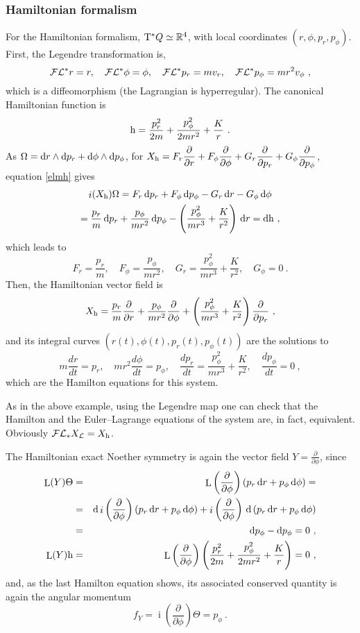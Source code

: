 \documentclass[12pt]{report}
\def\beann{\begin{eqnarray*}}
\def\eeann{\end{eqnarray*}}
\def\dst{\displaystyle}
\def\derpar#1#2{\frac{\partial{#1}}{\partial{#2}}}
\def\Lag{{\cal L}}
\def\d{{\rm d}}
\def\Real{\mathbb{R}}
\def\Tan{{\rm T}}
\def\Lie{\mathop{\rm L}\nolimits}
\def\inn{\mathop{i}\nolimits}
\def\Leg{{\cal F}\Lag}
\begin{document}
\subsubsection{Hamiltonian formalism}


For the Hamiltonian formalism, $\Tan^*Q\simeq\Real^4$,
with local coordinates $(r,\phi,p_r,p_\phi)$. First, the Legendre transformation is,
$$
\Leg^*r=r  ,\quad \Leg^*\phi=\phi  ,\quad
\Leg^*p_r=mv_r  ,\quad \Leg^*p_\phi=mr^2v_\phi\ ,
$$
which is a diffeomorphism (the Lagrangian is hyperregular).
The canonical Hamiltonian function is
$$
{\rm h}=\frac{p_r^2}{2m}+\frac{p_\phi^2}{2mr^2}+\frac{K}{r} \ .
$$
As $\Omega=\d r\wedge\d p_r+\d \phi\wedge\d p_\phi$,
for $\displaystyle X_{\rm h}=F_r\derpar{}{r}+F_\phi\derpar{}{\phi}+
G_r\derpar{}{p_r}+G_\phi\derpar{}{p_\phi}$,
equation \eqref{elmh} gives
\begin{multline*}
\inn(X_{\rm h})\Omega= 
F_r\, \d p_r+F_\phi\, \d p_\phi-G_r\, \d r-G_\phi\, \d \phi\\
=\frac{p_r}{m}\, \d p_r+\frac{p_\phi}{mr^2}\, \d p_\phi-
\left(\frac{p_\phi^2}{mr^3}+\frac{K}{r^2}\right)\, \d r=\d{\rm h}\ ,
\end{multline*}
which leads to
$$
F_r=\frac{p_r}{m} ,\quad F_\phi=\frac{p_\phi}{mr^2} ,\quad
G_r=\frac{p_\phi^2}{mr^3}+\frac{K}{r^2} ,\quad G_\phi=0  \ .
$$
Then, the Hamiltonian vector field is
$$
X_{\rm h}=\frac{p_r}{m}\derpar{}{r}+\frac{p_\phi}{mr^2}\derpar{}{\phi}+\left(\frac{p_\phi^2}{mr^3}+\frac{K}{r^2}\right)\derpar{}{p_r} \ ,
$$
and its integral curves $(r(t),\phi(t),p_r(t),p_\phi(t))$ are the solutions to
$$
m\frac{dr}{dt} =p_r ,\quad mr^2\frac{d\phi}{dt} =p_\phi ,\quad
\frac{dp_r}{dt}=\frac{p_\phi^2}{mr^3}+\frac{K}{r^2} ,\quad
\frac{dp_\phi}{dt}=0 \ ,
$$
which are the Hamilton equations for this system.

As in the above example, using the Legendre map
one can check that the Hamilton and
the Euler--Lagrange equations of the system are, in fact, equivalent.
Obviously $\Leg_*X_\Lag=X_{\rm h}$.

The Hamiltonian exact Noether symmetry is again the
vector field $\dst Y=\derpar{}{\phi}$, since
\beann
\Lie(Y)\Theta&=& 
\Lie\left(\derpar{}{\phi}\right)\left(p_r\,\d r+p_\phi\,\d\phi\right) =\\ &=&
\d\inn\left(\derpar{}{\phi}\right)\left(p_r\,\d r+p_\phi\,\d\phi\right) +
\inn\left(\derpar{}{\phi}\right)\,\d\left(p_r\,\d r+p_\phi\,\d\phi\right)  \\ &=&
\d p_\phi-\d p_\phi=0 \ , 
\\
\Lie(Y){\rm h}&=& 
\Lie\left(\derpar{}{\phi}\right)\left(\frac{p_r^2}{2m}+\frac{p_\phi^2}{2mr^2}+\frac{K}{r}\right)=0 \ ,
\eeann
and, as the last Hamilton equation shows,
 its associated conserved quantity is again the angular momentum
$$
f_Y=\inn\left(\derpar{}{\phi}\right)\Theta=p_\phi \ .
$$
\end{document}
